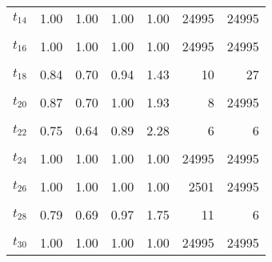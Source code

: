 \begin{table}
\begin{tabular}[t]{lrrrrrr}
$t_{14}$ & 1.00 & 1.00 & 1.00 & 1.00 & 24995 & 24995\\
\cellcolor{gray!6}{$t_{15}$} & \cellcolor{gray!6}{0.88} & \cellcolor{gray!6}{0.69} & \cellcolor{gray!6}{0.95} & \cellcolor{gray!6}{2.56} & \cellcolor{gray!6}{6} & \cellcolor{gray!6}{9}\\
$t_{16}$ & 1.00 & 1.00 & 1.00 & 1.00 & 24995 & 24995\\
\cellcolor{gray!6}{$t_{17}$} & \cellcolor{gray!6}{0.95} & \cellcolor{gray!6}{0.83} & \cellcolor{gray!6}{1.00} & \cellcolor{gray!6}{1.60} & \cellcolor{gray!6}{9} & \cellcolor{gray!6}{24995}\\
$t_{18}$ & 0.84 & 0.70 & 0.94 & 1.43 & 10 & 27\\
\cellcolor{gray!6}{$t_{19}$} & \cellcolor{gray!6}{1.00} & \cellcolor{gray!6}{1.00} & \cellcolor{gray!6}{1.00} & \cellcolor{gray!6}{1.00} & \cellcolor{gray!6}{24995} & \cellcolor{gray!6}{24995}\\
$t_{20}$ & 0.87 & 0.70 & 1.00 & 1.93 & 8 & 24995\\
\cellcolor{gray!6}{$t_{21}$} & \cellcolor{gray!6}{0.81} & \cellcolor{gray!6}{0.75} & \cellcolor{gray!6}{0.87} & \cellcolor{gray!6}{2.13} & \cellcolor{gray!6}{9} & \cellcolor{gray!6}{6}\\
$t_{22}$ & 0.75 & 0.64 & 0.89 & 2.28 & 6 & 6\\
\cellcolor{gray!6}{$t_{23}$} & \cellcolor{gray!6}{0.83} & \cellcolor{gray!6}{0.76} & \cellcolor{gray!6}{0.97} & \cellcolor{gray!6}{1.78} & \cellcolor{gray!6}{9} & \cellcolor{gray!6}{28}\\
$t_{24}$ & 1.00 & 1.00 & 1.00 & 1.00 & 24995 & 24995\\
\cellcolor{gray!6}{$t_{25}$} & \cellcolor{gray!6}{0.90} & \cellcolor{gray!6}{0.68} & \cellcolor{gray!6}{0.99} & \cellcolor{gray!6}{2.70} & \cellcolor{gray!6}{6} & \cellcolor{gray!6}{6}\\
$t_{26}$ & 1.00 & 1.00 & 1.00 & 1.00 & 2501 & 24995\\
\cellcolor{gray!6}{$t_{27}$} & \cellcolor{gray!6}{0.89} & \cellcolor{gray!6}{0.78} & \cellcolor{gray!6}{0.98} & \cellcolor{gray!6}{2.31} & \cellcolor{gray!6}{10} & \cellcolor{gray!6}{6}\\
$t_{28}$ & 0.79 & 0.69 & 0.97 & 1.75 & 11 & 6\\
\cellcolor{gray!6}{$t_{29}$} & \cellcolor{gray!6}{0.98} & \cellcolor{gray!6}{0.91} & \cellcolor{gray!6}{1.00} & \cellcolor{gray!6}{2.10} & \cellcolor{gray!6}{7} & \cellcolor{gray!6}{24995}\\
$t_{30}$ & 1.00 & 1.00 & 1.00 & 1.00 & 24995 & 24995\\

\end{tabular}
\end{table}
